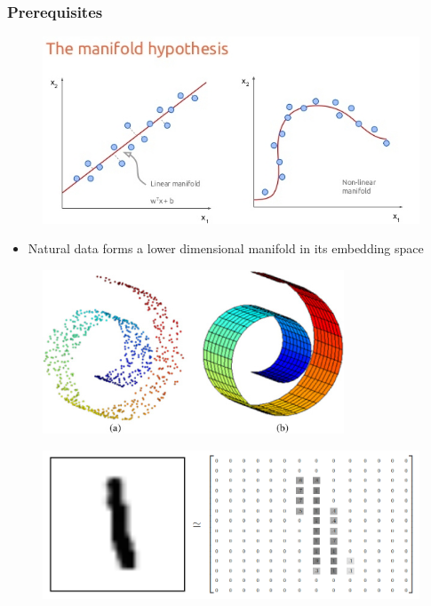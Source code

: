 \documentclass{beamer}
\begin{document}
\begin{frame}
\frametitle{Prerequisites}
\begin{figure}[h!]
	\centering
	\includegraphics[width=\textwidth]{manifold_hypothesis.jpg}
\end{figure}

\begin{itemize}
	\item Natural data forms a lower dimensional manifold in its embedding space
\end{itemize}

\end{frame}
\begin{frame}
\begin{figure}[h!]
	\centering
	\includegraphics[width=0.8\textwidth]{swiss_roll.jpg}
\end{figure}

\end{frame}

\begin{frame}
\begin{figure}[h!]
	\centering
	\includegraphics[width=\textwidth]{mnist_pixel_space.png}
\end{figure}

\end{frame}
\end{document}
